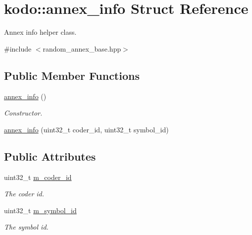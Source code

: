 \hypertarget{structkodo_1_1annex__info}{\section{kodo\-:\-:annex\-\_\-info Struct Reference}
\label{structkodo_1_1annex__info}
}


Annex info helper class.  




{\ttfamily \#include $<$random\-\_\-annex\-\_\-base.\-hpp$>$}

\subsection*{Public Member Functions}
\begin{DoxyCompactItemize}
\item 
\hypertarget{structkodo_1_1annex__info_a22159c6554275b379de35721fcdb554e}{\hyperlink{structkodo_1_1annex__info_a22159c6554275b379de35721fcdb554e}{annex\-\_\-info} ()}\label{structkodo_1_1annex__info_a22159c6554275b379de35721fcdb554e}

\begin{DoxyCompactList}\small\item\em Constructor. \end{DoxyCompactList}\item 
\hyperlink{structkodo_1_1annex__info_a91e84136c9149339b75e09165f0ed629}{annex\-\_\-info} (uint32\-\_\-t coder\-\_\-id, uint32\-\_\-t symbol\-\_\-id)
\end{DoxyCompactItemize}
\subsection*{Public Attributes}
\begin{DoxyCompactItemize}
\item 
\hypertarget{structkodo_1_1annex__info_a18653db295d0e1159972afaddc9660f6}{uint32\-\_\-t \hyperlink{structkodo_1_1annex__info_a18653db295d0e1159972afaddc9660f6}{m\-\_\-coder\-\_\-id}}\label{structkodo_1_1annex__info_a18653db295d0e1159972afaddc9660f6}

\begin{DoxyCompactList}\small\item\em The coder id. \end{DoxyCompactList}\item 
\hypertarget{structkodo_1_1annex__info_a0ca5452ee0668471876ec2878a9d8998}{uint32\-\_\-t \hyperlink{structkodo_1_1annex__info_a0ca5452ee0668471876ec2878a9d8998}{m\-\_\-symbol\-\_\-id}}\label{structkodo_1_1annex__info_a0ca5452ee0668471876ec2878a9d8998}

\begin{DoxyCompactList}\small\item\em The symbol id. \end{DoxyCompactList}\end{DoxyCompactItemize}


